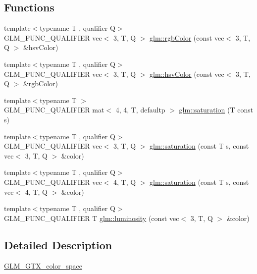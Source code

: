 \subsection*{Functions}
\begin{DoxyCompactItemize}
\item 
{\footnotesize template$<$typename T , qualifier Q$>$ }\\G\+L\+M\+\_\+\+F\+U\+N\+C\+\_\+\+Q\+U\+A\+L\+I\+F\+I\+ER vec$<$ 3, T, Q $>$ \hyperlink{group__gtx__color__space_ga5f9193be46f45f0655c05a0cdca006db}{glm\+::rgb\+Color} (const vec$<$ 3, T, Q $>$ \&hsv\+Color)
\item 
{\footnotesize template$<$typename T , qualifier Q$>$ }\\G\+L\+M\+\_\+\+F\+U\+N\+C\+\_\+\+Q\+U\+A\+L\+I\+F\+I\+ER vec$<$ 3, T, Q $>$ \hyperlink{group__gtx__color__space_ga789802bec2d4fe0f9741c731b4a8a7d8}{glm\+::hsv\+Color} (const vec$<$ 3, T, Q $>$ \&rgb\+Color)
\item 
{\footnotesize template$<$typename T $>$ }\\G\+L\+M\+\_\+\+F\+U\+N\+C\+\_\+\+Q\+U\+A\+L\+I\+F\+I\+ER mat$<$ 4, 4, T, defaultp $>$ \hyperlink{group__gtx__color__space_ga01a97152b44e1550edcac60bd849e884}{glm\+::saturation} (T const s)
\item 
{\footnotesize template$<$typename T , qualifier Q$>$ }\\G\+L\+M\+\_\+\+F\+U\+N\+C\+\_\+\+Q\+U\+A\+L\+I\+F\+I\+ER vec$<$ 3, T, Q $>$ \hyperlink{group__gtx__color__space_ga2156cea600e90148ece5bc96fd6db43a}{glm\+::saturation} (const T s, const vec$<$ 3, T, Q $>$ \&color)
\item 
{\footnotesize template$<$typename T , qualifier Q$>$ }\\G\+L\+M\+\_\+\+F\+U\+N\+C\+\_\+\+Q\+U\+A\+L\+I\+F\+I\+ER vec$<$ 4, T, Q $>$ \hyperlink{group__gtx__color__space_gaba0eacee0736dae860e9371cc1ae4785}{glm\+::saturation} (const T s, const vec$<$ 4, T, Q $>$ \&color)
\item 
{\footnotesize template$<$typename T , qualifier Q$>$ }\\G\+L\+M\+\_\+\+F\+U\+N\+C\+\_\+\+Q\+U\+A\+L\+I\+F\+I\+ER T \hyperlink{group__gtx__color__space_gad028e0a4f1a9c812b39439b746295b34}{glm\+::luminosity} (const vec$<$ 3, T, Q $>$ \&color)
\end{DoxyCompactItemize}


\subsection{Detailed Description}
\hyperlink{group__gtx__color__space}{G\+L\+M\+\_\+\+G\+T\+X\+\_\+color\+\_\+space} 